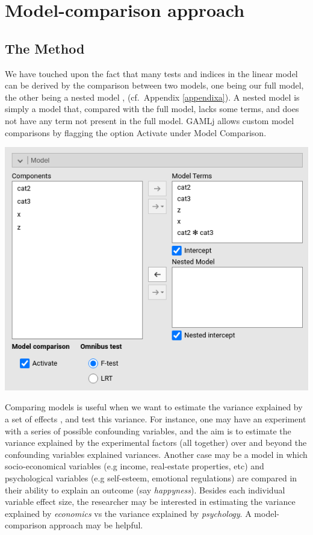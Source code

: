 \documentclass[
]{book}
\begin{document}
\hypertarget{model-comparison-approach}{%
\section{Model-comparison approach}\label{model-comparison-approach}}

\hypertarget{the-method}{%
\subsection{The Method}\label{the-method}}

We have touched upon the fact that many tests and indices in the linear model can be derived by the comparison between two models, one being our full model, the other being a nested model \citep{judd2017data}, (cf.~Appendix \ref{appendixa}). A nested model is simply a model that, compared with the full model, lacks some terms, and does not have any term not present in the full model. {GAMLj} allows custom model comparisons by flagging the option {Activate} under {Model Comparison}.

\includegraphics{bookletpics/2_modelcomparison_input1.png}

Comparing models is useful when we want to estimate the variance explained by a set of effects \citep{cohen2014applied}, and test this variance. For instance, one may have an experiment with a series of possible confounding variables, and the aim is to estimate the variance explained by the experimental factors (all together) over and beyond the confounding variables explained variances. Another case may be a model in which socio-economical variables (e.g income, real-estate properties, etc) and psychological variables (e.g self-esteem, emotional regulations) are compared in their ability to explain an outcome (say \emph{happyness}). Besides each individual variable effect size, the researcher may be interested in estimating the variance explained by \emph{economics} vs the variance explained by \emph{psychology}. A model-comparison approach may be helpful.
\end{document}
